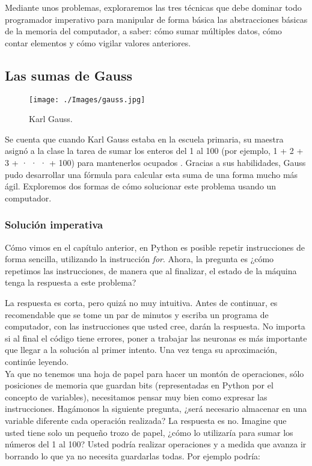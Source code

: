 Mediante unos problemas, exploraremos las tres técnicas que debe dominar todo programador imperativo para manipular de forma básica las abstracciones básicas de la memoria del computador, a saber: cómo sumar múltiples datos, cómo contar elementos y cómo vigilar valores anteriores.

\subsection{Las sumas de Gauss}

\begin{wrapfigure}{r}{0.3\textwidth}
	\begin{center}
		\texttt{[image: ./Images/gauss.jpg]}
	\end{center}	
	\caption{Karl Gauss.}
\end{wrapfigure}


Se cuenta que cuando Karl Gauss estaba en la escuela primaria, su maestra asignó a la clase la tarea de sumar los enteros del 1 al 100 (por ejemplo, 1 + 2 + 3 + · · · + 100) para mantenerlos ocupados \cite[p.~59]{evansIntro}. Gracias a sus habilidades, Gauss pudo desarrollar una fórmula para calcular esta suma de una forma mucho más ágil. Exploremos dos formas de cómo solucionar este problema usando un computador.

\subsubsection{Solución imperativa}
Cómo vimos en el capítulo anterior, en Python es posible repetir instrucciones de forma sencilla, utilizando la instrucción \emph{for}. Ahora, la pregunta es ¿cómo repetimos las instrucciones, de manera que al finalizar, el estado de la máquina tenga la respuesta a este problema?

La respuesta es corta, pero quizá no muy intuitiva. Antes de continuar, es recomendable que se tome un par de minutos y escriba un programa de computador, con las instrucciones que usted cree, darán la respuesta. No importa si al final el código tiene errores, poner a trabajar las neuronas es más importante que llegar a la solución al primer intento. Una vez tenga su aproximación, continúe leyendo.
\\

Ya que no tenemos una hoja de papel para hacer un montón de operaciones, sólo posiciones de memoria que guardan bits (representadas en Python por el concepto de variables), necesitamos pensar muy bien como expresar las instrucciones. Hagámonos la siguiente pregunta, ¿será necesario almacenar en una variable diferente cada operación realizada? La respuesta es no. Imagine que usted tiene solo un pequeño trozo de papel, ¿cómo lo utilizaría para sumar los números del 1 al 100? Usted podría realizar operaciones y a medida que avanza ir borrando lo que ya no necesita guardarlas todas. Por ejemplo podría:

